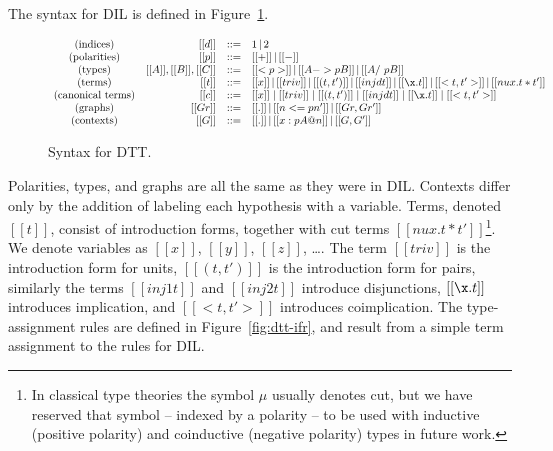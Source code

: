 The syntax for DIL is defined in Figure~\ref{fig:dtt-syntax}.
\begin{figure}[t]
  
  \begin{center}
    \begin{math}
      \begin{array}{crllllllllllllllllllll}
        (\text{indices})    & [[d]] & ::= & 1\,|\,2\\
        (\text{polarities}) & [[p]] & ::= & [[+]] \,|\, [[-]]\\
        (\text{types})      & [[A]],[[B]],[[C]] & ::= & [[< p >]]\,|\, [[A -> p B]]\,|\,[[A /\ p B]]\\
        (\text{terms})      & [[t]]  & ::= & 
                                 [[x]]\,|\,[[triv]]\,|\,[[(t,t')]]\,|\,[[inj d t]]\,|\,[[\x.t]]\,|\,[[<t,t'>]]\,|\,[[nu x.t*t']]\\
   (\text{canonical terms}) & [[c]] & ::= & [[x]] \mid [[triv]] \mid [[( t , t' )]] \mid [[inj d t]] \mid [[\x.t]] \mid [[<t,t'>]]\\
        (\text{graphs})     & [[Gr]] & ::= & [[.]] \,|\, [[n <= p n']] \,|\, [[Gr , Gr']]\\
        (\text{contexts})   & [[G]] & ::= & [[.]] \,|\, [[x : p A @ n]] \,|\, [[G , G']]\\
      \end{array}
    \end{math}
  \end{center}

  \caption{Syntax for DTT.}
  \label{fig:dtt-syntax}
\end{figure}
Polarities, types, and graphs are all the same as they were in DIL.
Contexts differ only by the addition of labeling each hypothesis with
a variable.  Terms, denoted $[[t]]$, consist of introduction
forms, together with cut terms $[[nu x . t * t']]$\footnote{In
  classical type theories the symbol $\mu$ usually denotes cut, but we
  have reserved that symbol -- indexed by a polarity -- to be used
  with inductive (positive polarity) and coinductive (negative
  polarity) types in future work.}.  We
denote variables as $[[x]]$, $[[y]]$, $[[z]]$, \ldots. The term
$[[triv]]$ is the introduction form for units, $[[(t, t')]]$ is the
introduction form for pairs, similarly the terms $[[inj 1 t]]$ and
$[[inj 2 t]]$ introduce disjunctions, $[[\x.t]]$ introduces
implication, and $[[<t,t'>]]$ introduces coimplication.  The
type-assignment rules are defined in Figure~\ref{fig:dtt-ifr}, and
result from a simple term assignment to the rules for DIL.
